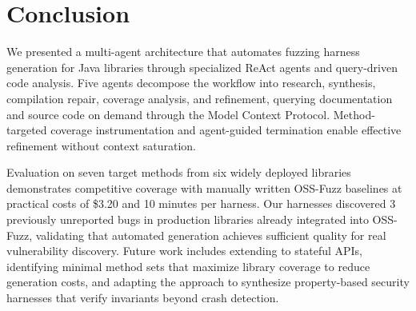 \documentclass[sigconf,review,anonymous]{acmart}
\begin{document}



\maketitle









\section{Conclusion}

We presented a multi-agent architecture that automates fuzzing harness generation for Java libraries through specialized ReAct agents and query-driven code analysis. Five agents decompose the workflow into research, synthesis, compilation repair, coverage analysis, and refinement, querying documentation and source code on demand through the Model Context Protocol. Method-targeted coverage instrumentation and agent-guided termination enable effective refinement without context saturation.

Evaluation on seven target methods from six widely deployed libraries demonstrates competitive coverage with manually written OSS-Fuzz baselines at practical costs of \$3.20 and 10 minutes per harness. Our harnesses discovered 3 previously unreported bugs in production libraries already integrated into OSS-Fuzz, validating that automated generation achieves sufficient quality for real vulnerability discovery. Future work includes extending to stateful APIs, identifying minimal method sets that maximize library coverage to reduce generation costs, and adapting the approach to synthesize property-based security harnesses that verify invariants beyond crash detection.

%



\end{document}
